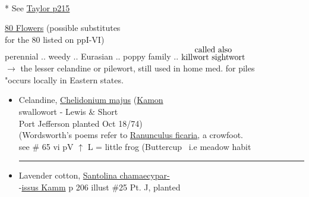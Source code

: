 \documentclass[a4paper,10pt]{article}
\begin{document}
\color{blue}
\begin{flushright}
\\
\end{flushright}
\begin{flushleft}
\color{red} 
\begin{turn}{25}%
* See \ul{Taylor p215} 
\end{turn}
\ul{80 Flowers} (possible substitutes\\
\color{red}for the 80 listed on ppI-VI) \hfill \color{blue} \\

\color{red}
\small
{} perennial .. weedy .. Eurasian .. poppy family .. {$\stackrel{\hbox{called also}}{\hbox{killwort sightwort}}$}\\
 $\rightarrow$ the lesser celandine or pilewort, still used in home med. for piles\\
"occurs locally in Eastern states.\\
\begin{itemize}
\color{blue}
\normalsize
\item Celandine, \ul{Chelidonium majus} (\ul{Kamon}\\
\tiny 
\color{red}
swallowort - Lewis \& Short\\
\color{blue}
\normalsize
\color{red}
 Port Jefferson planted Oct 18/74)\\
\color{red}
\small
{} (Wordsworth's poems refer to \ul{Ranunculus ficaria}, a crowfoot.\\
see \# 65 vi pV 
\color{blue}
$\uparrow$ L = little frog (Buttercup \ i.e meadow habit
\rule{10cm}{0.01cm}
\normalsize
\item Lavender cotton, \ul{Santolina chamaecypar-}\\
-\ul{issus Kamm} p 206 illust \#25 Pt. J, planted\\ 
\color{red}
\tiny
\newsavebox{\abc}
%
\begin{turn}{25}\usebox{\abc}\end{turn}

\end{itemize}
\end{flushleft}
\end{document}
